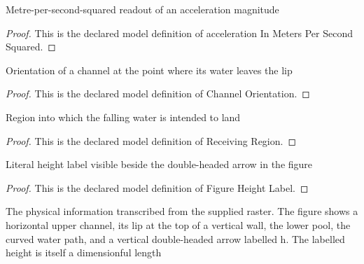 \begin{definition}
  \label{def:physics:phyx-mini-0684:phyxminiproblems-problemphyxmini0684-accelerationinmeterspersecondsquared}
  Metre-per-second-squared readout of an acceleration magnitude
\end{definition}
\begin{proof}
  This is the declared model definition of acceleration In Meters Per Second Squared.
\end{proof}
\begin{definition}
  \label{def:physics:phyx-mini-0684:phyxminiproblems-problemphyxmini0684-channelorientation}
  Orientation of a channel at the point where its water leaves the lip
\end{definition}
\begin{proof}
  This is the declared model definition of Channel Orientation.
\end{proof}
\begin{definition}
  \label{def:physics:phyx-mini-0684:phyxminiproblems-problemphyxmini0684-receivingregion}
  Region into which the falling water is intended to land
\end{definition}
\begin{proof}
  This is the declared model definition of Receiving Region.
\end{proof}
\begin{definition}
  \label{def:physics:phyx-mini-0684:phyxminiproblems-problemphyxmini0684-figureheightlabel}
  Literal height label visible beside the double-headed arrow in the figure
\end{definition}
\begin{proof}
  This is the declared model definition of Figure Height Label.
\end{proof}
\begin{definition}
  \label{def:physics:phyx-mini-0684:phyxminiproblems-problemphyxmini0684-waterfallfigure}
  The physical information transcribed from the supplied raster. The figure shows a horizontal upper channel, its lip at the top of a vertical wall, the lower pool, the curved water path, and a vertical double-headed arrow labelled h. The labelled height is itself a dimensionful length
\end{definition}
